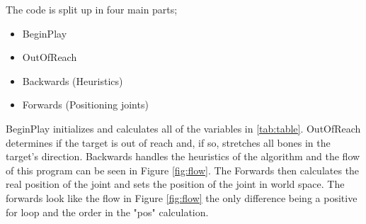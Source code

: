The code is split up in four main parts;

\begin{itemize}
\item BeginPlay
\item OutOfReach
\item Backwards (Heuristics)
\item Forwards (Positioning joints)
\end{itemize}

BeginPlay initializes and calculates all of the variables in \autoref{tab:table}. OutOfReach determines if the target is out of reach and, if so, stretches all bones in the target's direction. 
Backwards handles the heuristics of the algorithm and the flow of this program can be seen in Figure \ref{fig:flow}. The Forwards then calculates the real position of the joint and sets the position of the joint in world space. The forwards look like the flow in Figure \ref{fig:flow} the only difference being a positive for loop and the order in the "pos" calculation.

